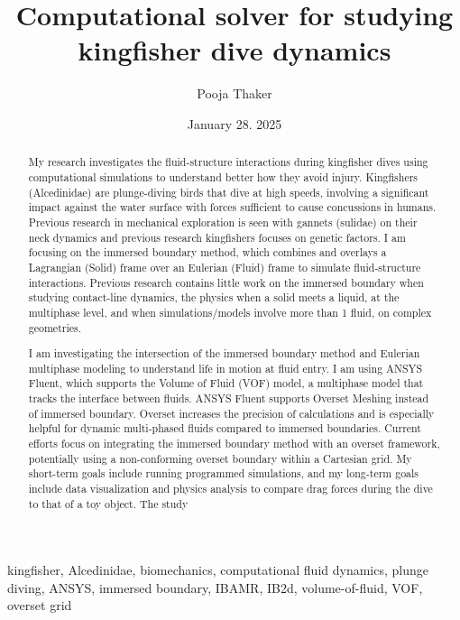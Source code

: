 \documentclass[12pt,conference,onecolumn]{IEEEtran}
\title{Computational solver for studying kingfisher dive dynamics }
\author{Pooja Thaker}
\date{January 28. 2025}
\newcommand{\keywords}{kingfisher, Alcedinidae, biomechanics, computational fluid dynamics, plunge diving, ANSYS, immersed boundary, IBAMR, IB2d, volume-of-fluid, VOF, overset grid}
\begin{document}
\maketitle 

\begin{abstract}
My research investigates the fluid-structure interactions during kingfisher dives using computational simulations to understand better how they avoid injury. Kingfishers (Alcedinidae) are plunge-diving birds that dive at high speeds, involving a significant impact against the water surface with forces sufficient to cause concussions in humans. Previous research in mechanical exploration is seen with gannets (sulidae) on their neck dynamics and previous research kingfishers focuses on genetic factors. I am focusing on the immersed boundary method, which combines and overlays a Lagrangian (Solid) frame over an Eulerian (Fluid) frame to simulate fluid-structure interactions. Previous research contains little work on the immersed boundary when studying contact-line dynamics, the physics when a solid meets a liquid, at the multiphase level, and when simulations/models involve more than 1 fluid, on complex geometries. 

I am investigating the intersection of the immersed boundary method and Eulerian multiphase modeling to understand life in motion at fluid entry. I am using ANSYS Fluent, which supports the Volume of Fluid (VOF) model, a multiphase model that tracks the interface between fluids. ANSYS Fluent supports Overset Meshing instead of immersed boundary. Overset increases the precision of calculations and is especially helpful for dynamic multi-phased fluids compared to immersed boundaries. Current efforts focus on integrating the immersed boundary method with an overset framework, potentially using a non-conforming overset boundary within a Cartesian grid. My short-term goals include running programmed simulations, and my long-term goals include data visualization and physics analysis to compare drag forces during the dive to that of a toy object. The study
\end{abstract}

\begin{IEEEkeywords}
\keywords
\end{IEEEkeywords}
\end{document}
